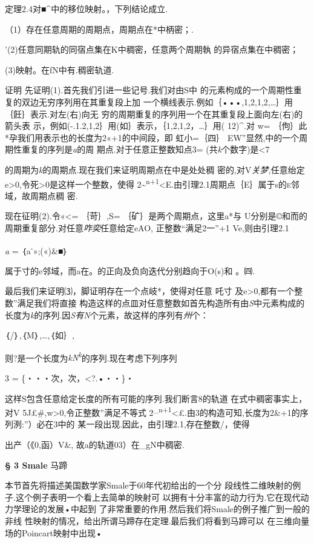 \documentclass{article}
\begin{document}
定理2.4对■\^{}中的移位映射。，下列结论成立.

（1）存在任意周期的周期点，周期点在*中柄密；.

'(2)任意同期轨的同宿点集在K中稠密，任意两个周期執 的异宿点集在中稠密；

(3)映射。在fN中有.稠密轨道.

证明 先证明(1).首先我们引进一些记号.我们对由S中
的元素枸成的一个周期性重复的双边无穷序列用在其重复段上加
一个横线表示.例如｛•••,1,2,1,2,\ldots{}｝用｛飪｝表示.对左(右)向无
穷的周期重复的序列用一个在其重复段上面向左(右)的箭头表
示，例如(-.1.2,1,2｝用(如｝表示，｛1,2,1,2，\ldots{}｝用( 12)\^{}.对 w=
｛佝｝此*孕我们用表示也的长度为2«+1的中间段，即 虹小=｛四｝
EW''显然,中的一个周期性重复的序列是\emph{a}的周
期点.对于任意正整数知点3= (共\emph{k}个数字)是\textless{}7

的周期为\emph{k}的周期点.现在我们来证明周期点在中是处处稠
密的,对V\emph{关梦,}任意绐定e\textgreater{}0,令死\textgreater{}0是这样一个整数，使得
2\textasciitilde{}\textsuperscript{n+1}\textless{}E.由引理2.1周期点｛E｝属于s的\textsc{e}邻域，故周期点稠
密.

现在征明(2).令«\textless{}= ｛苛｝,S= ｛矿｝是两个周期点，这里a*与
U分别是©和而的周期重复部分.对任意\emph{咋奕}任意给定eAO,
正整数``满足2一''+1 Ve,则由引理2.1

\emph{a} = ｛a\textsuperscript{-}»;(«)\&■｝

属于寸的e邻域，而a在。的正向及负向迭代分别趋向于O(s)和 。㈣.

最后我们来证明⑶，脚证明存在一个点岐*，使得对任意 吒寸
及e\textgreater{}0,都有一个整数''满足我们将直接
构造这样的点皿对任意整数如首先构造所有由\emph{S}中元素构成的
长度为\emph{k}的序列.因\emph{S有N}个元素，故这样的序列有\emph{州}个：

｛/｝,｛M｝,\ldots{},｛如｝,

则?是一个长度为\emph{kN\textsuperscript{k}}的序列.现在考虑下列序列

3 = \{・・・次，次，\textless{}?.•・・\}・

这样S包含任意给定长度的所有可能的序列.我们断言8的轨道
在式中稠密事实上，对V 5J£\#,w\textgreater{}0,令正整数''满足不等式
2\textsuperscript{\_n+1}\textless{}£.由3的构造可知,长度为2\&+1的序列洌:''）必在3中的
某一段出现.因此，由引理2.1,存在整数/，使得

出产（《0,函）V\&, 故a的轨道03）在\_gN中稠密.\textbar{}

\textbf{§ 3 Smale} 马蹄

本节首先将描述美国数学家Smale于60年代初给出的一个分
段线性二维映射的例子.这个例子表明一个看上去简单的映射可
以拥有十分丰富的动力行为.它在现代动力学理论的发展•中起到
了非常重要的作用.然后我们将Smale的例子推广到一般的非线
性映射的情况，给出所谓马蹄存在定理.最后我们将看到马蹄可以
在三维向量场的Poincart映射中出现•
\end{document}

